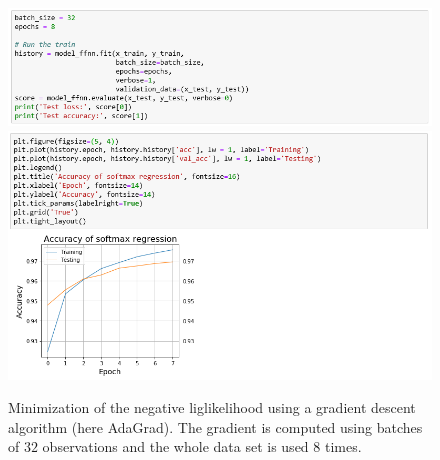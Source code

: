 \documentclass[9pt]{beamer}
\begin{document}
\begin{frame}
\begin{figure}
\begin{center}
\includegraphics[width = .85\linewidth]{./MNIST_ffnn3.png}
\includegraphics[width = .85\linewidth]{./MNIST_ffnn4.png}
\end{center}
\caption{Minimization of the negative liglikelihood using a gradient descent algorithm (here AdaGrad). The gradient is computed using batches of $32$ observations and the whole data set is used $8$ times.}
\end{figure}
\end{frame}
\end{document}
